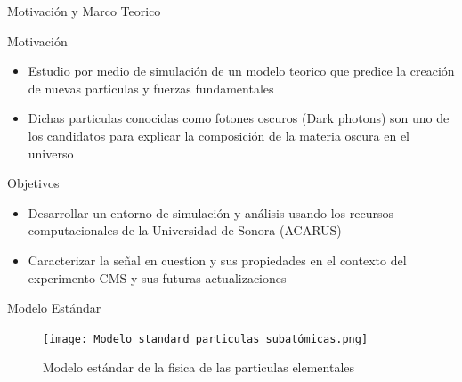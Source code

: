 \begin{frame}{}
    \begin{center}
        \LARGE Motivaci\'on y Marco Teorico
    \end{center}
\end{frame}


\begin{frame}{Motivaci\'on}

\begin{itemize}
    \item Estudio por medio de simulaci\'on de un modelo teorico que predice la creaci\'on de nuevas particulas y fuerzas fundamentales 
    \item Dichas particulas conocidas como fotones oscuros (Dark photons) son uno de los candidatos para explicar la composici\'on de la materia oscura en el universo 
    
\end{itemize}

\end{frame}

\begin{frame}{Objetivos}

\begin{itemize}
    \item Desarrollar un entorno de simulaci\'on y an\'alisis usando los recursos computacionales de la Universidad de Sonora (ACARUS) 
    \item Caracterizar la se\~nal en cuestion y sus propiedades en el contexto del experimento CMS y sus futuras actualizaciones 
\end{itemize}


\end{frame}

\begin{frame}{Modelo Est\'andar}

\begin{figure}
    \centering
    \texttt{[image: Modelo\_standard\_particulas\_subatómicas.png]}
    \caption{Modelo est\'andar de la fisica de las particulas elementales}
    \label{fig:my_label}
\end{figure}
\end{frame}

